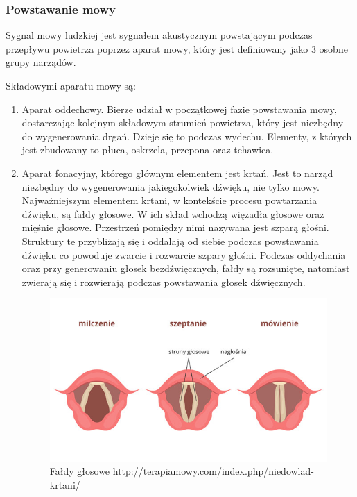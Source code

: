 \documentclass[a4paper,12 pt]{article}
\begin{document}
 
\subsubsection{Powstawanie mowy}

Sygnal mowy ludzkiej jest sygnałem akustycznym powstającym podczas przepływu powietrza poprzez aparat mowy, który jest definiowany jako 3 osobne grupy narządów. 

Składowymi aparatu mowy są:
\begin{enumerate}
\item Aparat oddechowy. Bierze udział w początkowej fazie powstawania mowy, dostarczając kolejnym składowym strumień powietrza, który jest niezbędny do wygenerowania drgań. Dzieje się to podczas wydechu. Elementy, z których jest zbudowany to płuca, oskrzela, przepona oraz tchawica.

\item Aparat fonacyjny, którego głównym elementem jest krtań. Jest to narząd niezbędny do wygenerowania jakiegokolwiek dźwięku, nie tylko mowy. Najważniejszym elementem krtani, w kontekście procesu powtarzania dźwięku, są fałdy głosowe. W ich skład wchodzą więzadła głosowe oraz mięśnie głosowe. Przestrzeń pomiędzy nimi nazywana jest szparą głośni. Struktury te przybliżają się i oddalają od siebie podczas powstawania dźwięku co powoduje zwarcie i rozwarcie szpary głośni. Podczas oddychania oraz przy generowaniu głosek bezdźwięcznych, fałdy są rozsunięte, natomiast zwierają się  i rozwierają podczas powstawania głosek dźwięcznych. 

\begin{figure}[!htbp]

\centering
\includegraphics[scale=0.5]{faldy_glosowe}
\caption{Fałdy głosowe http://terapiamowy.com/index.php/niedowlad-krtani/}


\end{figure}
\end{enumerate}
\end{document}
